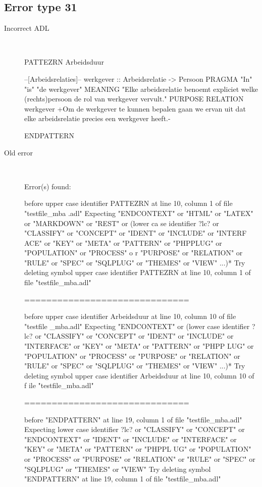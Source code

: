 \hrulefill

\subsection{Error type 31}
  \begin{description}
  \item[Incorrect ADL]~\\
\begin{adl}
PATTEZRN Arbeidsduur

--[Arbeidsrelaties]--
werkgever :: Arbeidsrelatie -> Persoon
PRAGMA "In" "is" "de werkgever"
MEANING "Elke arbeidsrelatie benoemt expliciet welke (rechts)persoon de rol van werkgever vervult."
PURPOSE RELATION werkgever
{+Om de werkgever te kunnen bepalen gaan we ervan uit dat elke arbeidsrelatie precies een werkgever heeft.-}

ENDPATTERN\end{adl}
  \item[Old error]~\\
\begin{haskell}
Error(s) found:

before upper case identifier PATTEZRN at line 10, column 1 of file "testfile_mba
.adl"
Expecting "ENDCONTEXT" or "HTML" or "LATEX" or "MARKDOWN" or "REST" or (lower ca
se identifier ?lc? or "CLASSIFY" or "CONCEPT" or "IDENT" or "INCLUDE" or "INTERF
ACE" or "KEY" or "META" or "PATTERN" or "PHPPLUG" or "POPULATION" or "PROCESS" o
r "PURPOSE" or "RELATION" or "RULE" or "SPEC" or "SQLPLUG" or "THEMES" or "VIEW"
 ...)*
Try deleting symbol upper case identifier PATTEZRN at line 10, column 1 of file
"testfile_mba.adl"

==============================

before upper case identifier Arbeidsduur at line 10, column 10 of file "testfile
_mba.adl"
Expecting "ENDCONTEXT" or (lower case identifier ?lc? or "CLASSIFY" or "CONCEPT"
 or "IDENT" or "INCLUDE" or "INTERFACE" or "KEY" or "META" or "PATTERN" or "PHPP
LUG" or "POPULATION" or "PROCESS" or "PURPOSE" or "RELATION" or "RULE" or "SPEC"
 or "SQLPLUG" or "THEMES" or "VIEW" ...)*
Try deleting symbol upper case identifier Arbeidsduur at line 10, column 10 of f
ile "testfile_mba.adl"

==============================

before "ENDPATTERN" at line 19, column 1 of file "testfile_mba.adl"
Expecting lower case identifier ?lc? or "CLASSIFY" or "CONCEPT" or "ENDCONTEXT"
or "IDENT" or "INCLUDE" or "INTERFACE" or "KEY" or "META" or "PATTERN" or "PHPPL
UG" or "POPULATION" or "PROCESS" or "PURPOSE" or "RELATION" or "RULE" or "SPEC"
or "SQLPLUG" or "THEMES" or "VIEW"
Try deleting symbol "ENDPATTERN" at line 19, column 1 of file "testfile_mba.adl"


\end{haskell}
\end{description}
